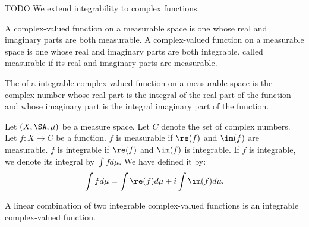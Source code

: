 
\sbasic

























\sstart
{}


TODO
We extend integrability
to complex functions.


A 
complex-valued function
on a measurable space is
one whose real and imaginary
parts are both measurable.
A 
complex-valued function
on a measurable space is
one whose real and imaginary
parts are both integrable.
called measurable if
its real and imaginary
parts are measurable.

The 
of a integrable complex-valued
function on a measurable space
is the complex number whose
real part is the integral
of the real part of the function
and whose imaginary part is the
integral imaginary part of the
function.



Let $(X, \SA, \mu)$
be a measure space.
Let $C$ denote the set
of complex numbers.
Let $f: X \to C$
be a function.
$f$ is measurable
if $\re(f)$ and $\im(f)$
are measurable.
$f$ is integrable if
$\re(f)$ and $\im(f)$
is integrable.
If $f$ is integrable,
we denote its integral
by $\int f d\mu$.
We have defined it by:
\[
  \int f d\mu = \int \re(f)d\mu
  + i\int \im(f) d\mu.
\]


\begin{prop}
A linear combination
of two integrable complex-valued
functions is an integrable
complex-valued function.
\end{prop}

